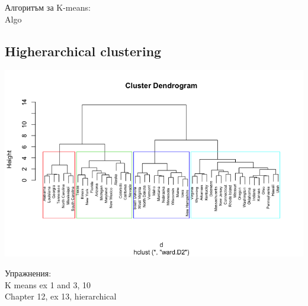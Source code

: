 \documentclass{article}
\begin{document}
	Алгоритъм за K-means: \\
	Algo \\
	\subsection{Higherarchical clustering}
	\includegraphics[scale=0.45]{hierarchical_clustering.png}


	Упражнения: \\
	K means ex 1 and 3, 10 \\
	Chapter 12, ex 13, hierarchical \\ 

	\cite{hastie01statisticallearning}
	
	
	\newpage
	
	\printbibliography

%	
%	
%	
%	
	
\end{document}
